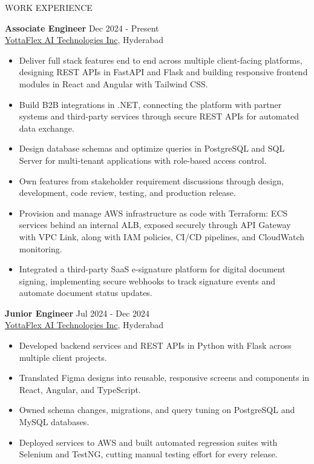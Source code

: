 \documentclass{resume} %
\begin{document}

\begin{rSection}{WORK EXPERIENCE}

\textbf{Associate Engineer} \hfill Dec 2024 - Present\\
\href{https://yottaflex.ai/}{YottaFlex AI Technologies Inc}, Hyderabad
\begin{itemize}
    \itemsep -3pt {}
    \item Deliver full stack features end to end across multiple client-facing platforms, designing REST APIs in FastAPI and Flask and building responsive frontend modules in React and Angular with Tailwind CSS.
    \item Build B2B integrations in .NET, connecting the platform with partner systems and third-party services through secure REST APIs for automated data exchange.
    \item Design database schemas and optimize queries in PostgreSQL and SQL Server for multi-tenant applications with role-based access control.
    \item Own features from stakeholder requirement discussions through design, development, code review, testing, and production release.
    \item Provision and manage AWS infrastructure as code with Terraform: ECS services behind an internal ALB, exposed securely through API Gateway with VPC Link, along with IAM policies, CI/CD pipelines, and CloudWatch monitoring.
    \item Integrated a third-party SaaS e-signature platform for digital document signing, implementing secure webhooks to track signature events and automate document status updates.
\end{itemize}

\textbf{Junior Engineer} \hfill Jul 2024 - Dec 2024\\
\href{https://yottaflex.ai/}{YottaFlex AI Technologies Inc}, Hyderabad
\begin{itemize}
    \itemsep -3pt {}
    \item Developed backend services and REST APIs in Python with Flask across multiple client projects.
    \item Translated Figma designs into reusable, responsive screens and components in React, Angular, and TypeScript.
    \item Owned schema changes, migrations, and query tuning on PostgreSQL and MySQL databases.
    \item Deployed services to AWS and built automated regression suites with Selenium and TestNG, cutting manual testing effort for every release.
\end{itemize}

\end{rSection}
\end{document}
